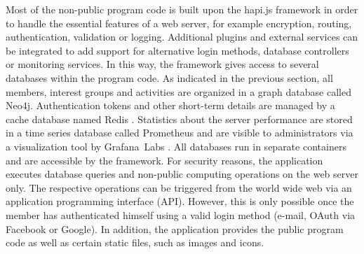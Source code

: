 \documentclass[12pt,numbers=noenddot,parskip,bibliography=totocnumbered,listof=totocnumbered,draft]{scrreprt}
\begin{document}
Most of the non-public program code is built upon the \mbox{hapi.js} \citep{hapijs} framework in order to handle the essential features of a web server, for example encryption, routing, authentication, validation or logging. Additional plugins and external services can be integrated to add support for alternative login methods, database controllers or monitoring services. In this way, the framework gives access to several databases within the program code. As indicated in the previous section, all members, interest groups and activities are organized in a graph database called \mbox{Neo4j}. Authentication tokens and other short-term details are managed by a cache database named \mbox{Redis} \citep{redis}. Statistics about the server performance are stored in a time series database called \mbox{Prometheus} \cite{prometheus} and are visible to administrators via a visualization tool by \mbox{Grafana Labs} \citep{grafana}. All databases run in separate containers and are accessible by the framework. For security reasons, the application executes database queries and non-public computing operations on the web server only. The respective operations can be triggered from the world wide web via an application programming interface (API). However, this is only possible once the member has authenticated himself using a valid login method (e-mail, \mbox{OAuth} via \mbox{Facebook} or \mbox{Google}). In addition, the application provides the public program code as well as certain static files, such as images and icons.
\end{document}
